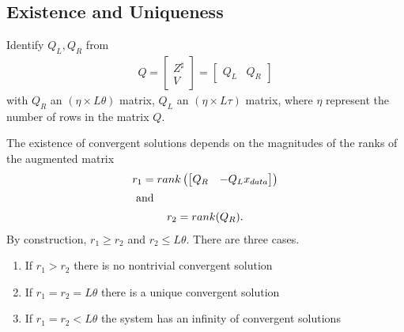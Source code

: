 \documentclass{elsart}
\begin{document}
\subsection{Existence and Uniqueness}
\label{sec:existunique}

\begin{thrm}
  \label{qzthm}
Identify $Q_L, Q_R$ from
\begin{gather}
  Q= 
  \begin{bmatrix}
    Z^{\sharp}\\V
  \end{bmatrix}
= 
  \begin{bmatrix}
    Q_L&Q_R
  \end{bmatrix} 
\end{gather}
{with $Q_R$ an $(\eta \times L\theta)$ matrix, 
$Q_L$ an $(\eta \times L\tau)$ matrix, where 
$\eta$ represent the number of rows in the matrix $Q$.}

The existence of convergent solutions depends on the magnitudes of the
ranks of the augmented
matrix 
\begin{gather}
r_1=rank \left (\begin{bmatrix}
Q_R&-Q_L x_{data}
  \end{bmatrix} 
\right)
\\ 
\intertext{ and  }
r_2=rank(Q_R).
\end{gather}
By construction,  $r_1 \ge r_2$ and $r_2 \le L\theta$.
There are three cases.
\begin{enumerate}
\item If $r_1 > r_2$ there is no nontrivial convergent solution
\item If $r_1 = r_2 = L  \theta$ there is a unique convergent solution
\item If $r_1 = r_2 < L  \theta$ the system has an infinity of convergent 
solutions
\end{enumerate}

\end{thrm}
\end{document}
